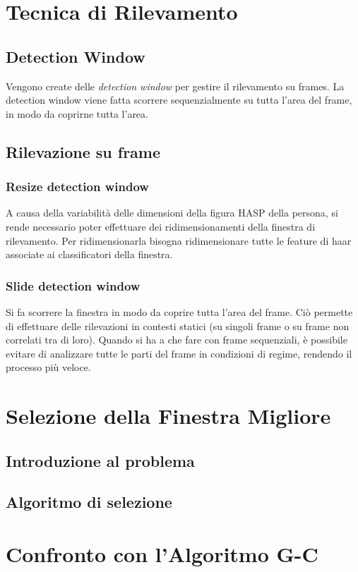     \section{Tecnica di Rilevamento}
    \label{sec:detection_tecnique}
        \subsection{Detection Window}
            Vengono create delle \emph{detection window} per gestire il rilevamento su frames.
            La detection window viene fatta scorrere sequenzialmente su tutta l'area del frame, in modo da coprirne tutta l'area.
        \subsection{Rilevazione su frame}
            \subsubsection{Resize detection window}
                A causa della variabilità delle dimensioni della figura HASP della persona, si rende necessario poter effettuare dei ridimensionamenti della finestra di rilevamento. 
                Per ridimensionarla bisogna ridimensionare tutte le feature di haar associate ai classificatori della finestra.
            \subsubsection{Slide detection window}
                Si fa scorrere la finestra in modo da coprire tutta l'area del frame.
                Ciò permette di effettuare delle rilevazioni in contesti statici (su singoli frame o su frame non correlati tra di loro).
                Quando si ha a che fare con frame sequenziali, è possibile evitare di analizzare tutte le parti del frame in condizioni di regime, rendendo il processo più veloce.
    \section{Selezione della Finestra Migliore} %
    \label{sec:best_detection_window}
        \subsection{Introduzione al problema}
        \subsection{Algoritmo di selezione}
    \section{Confronto con l'Algoritmo G-C} %
    \label{sec:gc_algorithm_comparison}